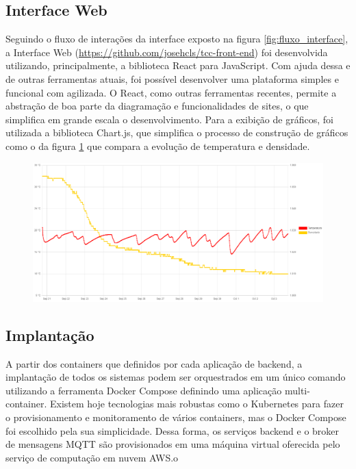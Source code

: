 \subsection{Interface Web}


Seguindo o fluxo de interações da interface exposto na figura \ref{fig:fluxo_interface}, a Interface Web (\url{https://github.com/josehcls/tcc-front-end}) foi desenvolvida utilizando, principalmente, a biblioteca React para JavaScript. Com ajuda dessa e de outras ferramentas atuais, foi possível desenvolver uma plataforma simples e funcional com agilizada. O React, como outras ferramentas recentes, permite a abstração de boa parte da diagramação e funcionalidades de sites, o que simplifica em grande escala o desenvolvimento. Para a exibição de gráficos, foi utilizada a biblioteca Chart.js, que simplifica o processo de construção de gráficos como o da figura \ref{fig:grafico_chart} que compara a evolução de temperatura e densidade.


\begin{figure}[h]
    \centering
    \includegraphics[scale=0.4]{figuras/implementacao/software/grafico_chartjs.PNG}
    \label{fig:grafico_chart}
\end{figure}


\subsection{Implantação}


A partir dos containers que definidos por cada aplicação de backend, a implantação de todos os sistemas podem ser orquestrados em um único comando utilizando a ferramenta Docker Compose definindo uma aplicação multi-container. Existem hoje tecnologias mais robustas como o Kubernetes para fazer o provisionamento e monitoramento de vários containers, mas o Docker Compose foi escolhido pela sua simplicidade. Dessa forma, os serviços backend e o broker de mensagens MQTT são provisionados em uma máquina virtual oferecida pelo serviço de computação em nuvem AWS.o



